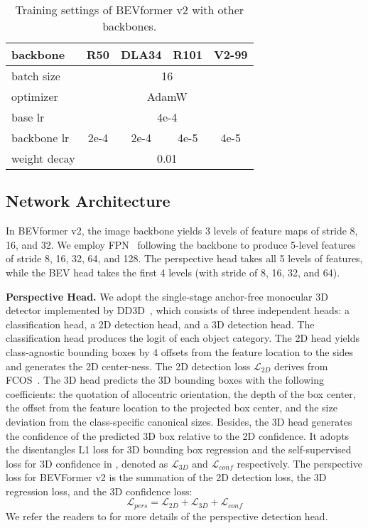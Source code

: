\documentclass[10pt,twocolumn,letterpaper]{article}
\begin{document}
\let\ck\checkmark

\setlength{\tabcolsep}{5pt}
\setlength{\doublerulesep}{2\arrayrulewidth}
\renewcommand{\arraystretch}{1.0}
\begin{table}[ht]
    \caption{Training settings of BEVformer v2 with other backbones.}
    \label{table:training_setting_other}
    \centering
    \begin{tabular}{l|cccc}
backbone & R50 & DLA34 & R101 & V2-99 \\
        \hline
        batch size & \multicolumn{4}{c}{16} \\
        optimizer & \multicolumn{4}{c}{AdamW} \\
        base lr & \multicolumn{4}{c}{4e-4} \\
        backbone lr & 2e-4 & 2e-4 & 4e-5 & 4e-5 \\
        weight decay & \multicolumn{4}{c}{0.01} \\
        \hline
    \end{tabular}
    
\end{table} 
\subsection{Network Architecture}
In BEVformer v2, the image backbone yields 3 levels of feature maps of stride 8, 16, and 32. We employ FPN~\cite{FPN} following the backbone to produce 5-level features of stride 8, 16, 32, 64, and 128. The perspective head takes all 5 levels of features, while the BEV head takes the first 4 levels (with stride of 8, 16, 32, and 64).

\noindent\textbf{Perspective Head.} We adopt the single-stage anchor-free monocular 3D detector implemented by DD3D~\cite{DD3D}, which consists of three independent heads: a classification head, a 2D detection head, and a 3D detection head. 
The classification head produces the logit of each object category. 
The 2D head yields class-agnostic bounding boxes by 4 offsets from the feature location to the sides and generates the 2D center-ness. 
The 2D detection loss $\mathcal{L}_{2D}$ derives from FCOS~\cite{fcos}.
The 3D head predicts the 3D bounding boxes with the following coefficients: the quotation of allocentric orientation, the depth of the box center, the offset from the feature location to the projected box center, and the size deviation from the class-specific canonical sizes. 
Besides, the 3D head generates the confidence of the predicted 3D box relative to the 2D confidence.
It adopts the disentangles L1 loss for 3D bounding box regression and the self-supervised loss for 3D confidence in \cite{MonoDIS}, denoted as $\mathcal{L}_{3D}$ and $\mathcal{L}_{conf}$ respectively. 
The perspective loss for BEVFormer v2 is the summation of the 2D detection loss, the 3D regression loss, and the 3D confidence loss:
\begin{equation}
    \mathcal{L}_{pers} = \mathcal{L}_{2D} + \mathcal{L}_{3D} + \mathcal{L}_{conf}
\end{equation}
We refer the readers to \cite{DD3D} for more details of the perspective detection head.
\end{document}
